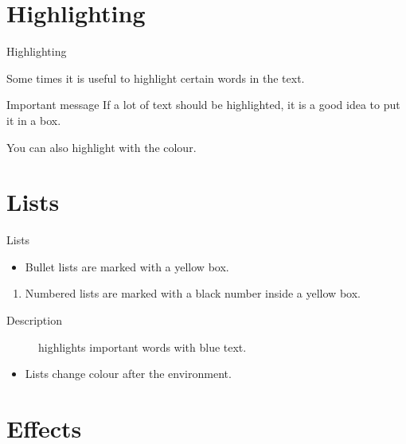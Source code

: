 \documentclass[UKenglish, aspectratio = 169]{beamer}
\begin{document}
\section{Highlighting}
\SectionPage

\begin{frame}{Highlighting}

    Some times it is useful to \alert{highlight} certain words in the text.

    \begin{alertblock}{Important message}
        If a lot of text should be \alert{highlighted}, it is a good idea to put it in a box.
    \end{alertblock}

    You can also highlight with the  colour.
\end{frame}

\section{Lists}

\begin{frame}{Lists}

    \begin{itemize}
        \item
        Bullet lists are marked with a yellow box.
    \end{itemize}

    \begin{enumerate}
        \item
        Numbered lists are marked with a black number inside a yellow box.
    \end{enumerate}

    \begin{description}
        \item[Description] highlights important words with blue text.
    \end{description}

    \begin{example}
        \begin{itemize}
            \item
            Lists change colour after the environment.
        \end{itemize}
    \end{example}
\end{frame}

\section{Effects}
\end{document}
